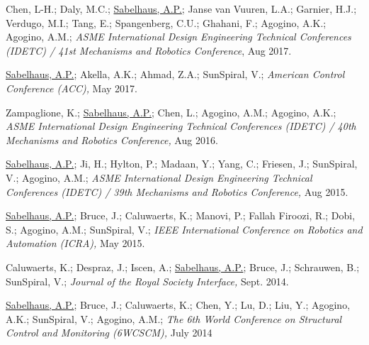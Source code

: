 \documentclass[letterpaper]{deedy-resume} %
\begin{document}
\begin{etaremune}

\item {} Chen, L-H.;  Daly, M.C.; \underline{Sabelhaus, A.P.}; Janse van Vuuren, L.A.; Garnier, H.J.; Verdugo, M.I.; Tang, E.; Spangenberg, C.U.; Ghahani, F.; Agogino, A.K.; Agogino, A.M.; {\it ASME International Design Engineering Technical Conferences (IDETC) / 41st Mechanisms and Robotics Conference}, Aug 2017.

\item {} \underline{Sabelhaus, A.P.}; Akella, A.K.; Ahmad, Z.A.; SunSpiral, V.; {\it American Control Conference (ACC),} May 2017.
  
\item {} Zampaglione, K.; \underline{Sabelhaus, A.P.};  Chen, L.;  Agogino, A.M.;  Agogino, A.K.;  {\it ASME International Design Engineering Technical Conferences (IDETC) / 40th Mechanisms and Robotics Conference,} Aug 2016.
  
\item {} \underline{Sabelhaus, A.P.}; Ji, H.; Hylton, P.; Madaan, Y.; Yang, C.; Friesen, J.; SunSpiral, V.; Agogino, A.M.; {\it ASME International Design Engineering Technical Conferences (IDETC) / 39th Mechanisms and Robotics Conference,} Aug 2015.

\item {} \underline{Sabelhaus, A.P.}; Bruce, J.; Caluwaerts, K.; Manovi, P.; Fallah Firoozi, R.; Dobi, S.; Agogino, A.M.; SunSpiral, V.; {\it IEEE International Conference on Robotics and Automation (ICRA),} May 2015.

\item {} Caluwaerts, K.; Despraz, J.; Iscen, A.; \underline{Sabelhaus, A.P.}; Bruce, J.; Schrauwen, B.; SunSpiral, V.;  {\it Journal of the Royal Society Interface,} Sept. 2014.

\item {} \underline{Sabelhaus, A.P.}; Bruce, J.; Caluwaerts, K.; Chen, Y.; Lu, D.; Liu, Y.; Agogino, A.K.; SunSpiral, V.; Agogino, A.M.; {\it The 6th World Conference on Structural Control and Monitoring (6WCSCM),} July 2014


\end{etaremune}
\end{document}
